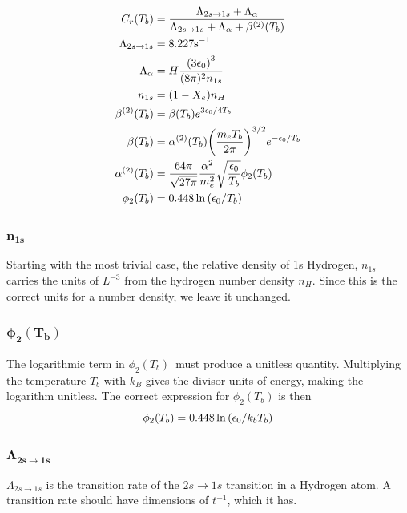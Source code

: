 \documentclass[10pt, a4paper]{article}
\begin{document}
\begin{align}
    \label{eqn:1}
    C_{r}\qty(T_{b}) &=\frac{\Lambda_{2 s \rightarrow 1 s}+\Lambda_{\alpha}}{\Lambda_{2 s \rightarrow 1 s}+\Lambda_{\alpha}+\beta^{(2)}\qty(T_{b})} \\
    \label{eqn:2}
    \Lambda_{2 s \rightarrow 1 s} &=8.227 \mathrm{s}^{-1} \\
    \label{eqn:4}
    \Lambda_{\alpha} &=H \frac{\qty(3 \epsilon_{0})^{3}}{(8 \pi)^{2} n_{1 s}} \\
    \label{eqn:5}
    n_{1 s} &=\qty(1-X_{e}) n_{H} \\
    \label{eqn:6}
    \beta^{(2)}\qty(T_{b}) &=\beta\qty(T_{b}) e^{3 \epsilon_{0} / 4 T_{b}} \\
    \label{eqn:7}
    \beta\qty(T_{b}) &=\alpha^{(2)}\qty(T_{b})\qty(\frac{m_{e} T_{b}}{2 \pi})^{3 / 2} e^{-\epsilon_{0} / T_{b}} \\
    \label{eqn:8}
    \alpha^{(2)}\qty(T_{b}) &=\frac{64 \pi}{\sqrt{27 \pi}} \frac{\alpha^{2}}{m_{e}^{2}} \sqrt{\frac{\epsilon_{0}}{T_{b}}} \phi_{2}\qty(T_{b}) \\
    \label{eqn:9}
    \phi_{2}\qty(T_{b}) &=0.448 \ln \qty(\epsilon_{0} / T_{b})
\end{align}



\subsubsection{\texorpdfstring{$\mathbf{n_{1s}}$}{TEXT} }
Starting with the most trivial case, the relative density of 1s Hydrogen, $n_{1s}$ carries the units of $L^{-3}$ from the hydrogen number density $n_H$. Since this is the correct units for a number density, we leave it unchanged.


\subsubsection{\texorpdfstring{$\mathbf{\phi_2(T_b)}$}{TEXT} }
The logarithmic term in $\phi_2(T_b)$ must produce a unitless quantity. Multiplying the temperature $T_b$ with $k_B$ gives the divisor units of energy, making the logarithm unitless. The correct expression for $\phi_2(T_b)$ is then
\begin{equation*}
    \phi_{2}\qty(T_{b}) = 0.448 \ln \qty(\epsilon_{0} / k_b T_{b})
\end{equation*}

\subsubsection{\texorpdfstring{$\mathbf{\Lambda_{2s\rightarrow1s}}$}{TEXT} }
$\Lambda_{2s\rightarrow1s}$ is the transition rate of the $2s\rightarrow 1s$ transition in a Hydrogen atom. A transition rate should have dimensions of $t^{-1}$, which it has.
\end{document}
